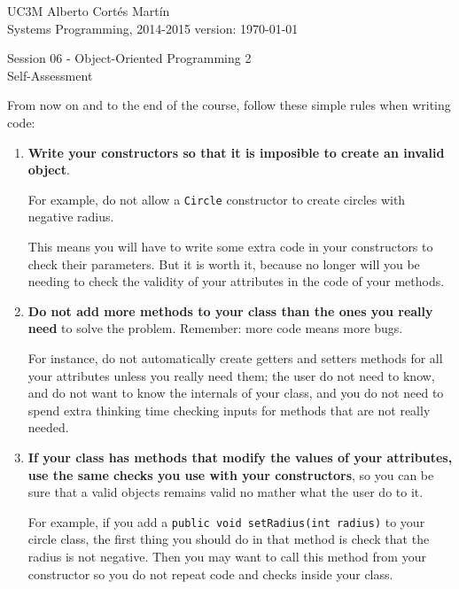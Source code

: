 \documentclass[a4paper, 11pt]{article}
\newcommand{\realtitle}{Session 06 - Object-Oriented Programming 2}
\begin{document}
\makebox[\linewidth]{\rule{\textwidth}{0.4pt}}
UC3M \hfill Alberto Cortés Martín\\
Systems Programming, 2014-2015 \hfill version: \today\\
\makebox[\linewidth]{\rule{\textwidth}{0.4pt}}
\begin{center}
  \Large{\realtitle}\\Self-Assessment
\end{center}
\makebox[\linewidth]{\rule{\textwidth}{0.4pt}}
\vspace{1cm}

From now on and to the end of the course, follow these simple rules when
writing code:

\begin{enumerate}

  \item \textbf{Write your constructors so that it is imposible to create
    an invalid object}.

    For example, do not allow a \verb+Circle+ constructor to
    create circles with negative radius.

    This means you will have to write some extra code in your constructors to
    check their parameters. But it is worth it, because no longer will you be
    needing to check the validity of your attributes in the code of your
    methods.

  \item \textbf{Do not add more methods to your class than the ones you really
    need} to solve the problem. Remember: more code means more bugs.

    For instance, do not automatically create getters and setters methods for
    all your attributes unless you really need them; the user do not need to
    know, and do not want to know the internals of your class, and you do not
    need to spend extra thinking time checking inputs for methods that are not
    really needed.

  \item \textbf{If your class has methods that modify the values of your
    attributes, use the same checks you use with your constructors}, so you can
    be sure that a valid objects remains valid no mather what the user do to
    it.

    For example, if you add a \verb+public void setRadius(int radius)+ to your
    circle class, the first thing you should do in that method is check that
    the radius is not negative. Then you may want to call this method from your
    constructor so you do not repeat code and checks inside your class.


\end{enumerate}
\end{document}
